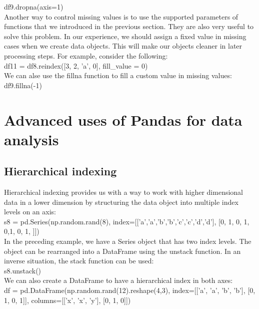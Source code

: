 \documentclass{article}
\numberwithin{equation}{section} %
\begin{document}
 df9.dropna(axis=1) \\
 
 Another way to control missing values is to use the supported parameters of
 functions that we introduced in the previous section. They are also very useful to
 solve this problem. In our experience, we should assign a fixed value in missing
 cases when we create data objects. This will make our objects cleaner in later
 processing steps. For example, consider the following: \\
 
 df11 = df8.reindex([3, 2, 'a', 0], fill\_value = 0) \\

We can alse use the fillna function to fill a custom value in missing values: \\

df9.fillna(-1) \\

\section*{Advanced uses of Pandas for data analysis}
 
\subsection*{Hierarchical indexing}
 
Hierarchical indexing provides us with a way to work with higher dimensional
data in a lower dimension by structuring the data object into multiple index
levels on an axis: \\

s8 = pd.Series(np.random.rand(8), index=[['a','a','b','b','c','c','d','d'], [0, 1, 0, 1, 0,1, 0, 1, ]]) \\

In the preceding example, we have a Series object that has two index levels. The object can be rearranged into a DataFrame using the unstack function. In an inverse situation, the stack function can be used: \\

s8.unstack() \\

We can also create a DataFrame to have a hierarchical index in both axes: \\

df = pd.DataFrame(np.random.rand(12).reshape(4,3), index=[['a', 'a', 'b', 'b'], [0, 1, 0, 1]], columns=[['x', 'x', 'y'], [0, 1, 0]]) \\
\end{document}
